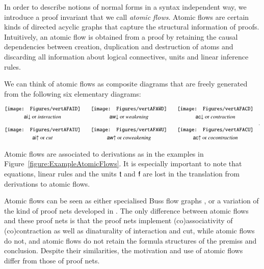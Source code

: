 In order to describe notions of normal forms in a syntax independent way, we introduce a proof invariant that we call \emph{atomic flows}. Atomic flows are certain kinds of directed acyclic graphs that capture the structural information of proofs. Intuitively, an atomic flow is obtained from a proof by retaining the causal dependencies between creation, duplication and destruction of atoms and discarding all information about logical connectives, units and linear inference rules.

We can think of atomic flows as composite diagrams that are freely generated from the following six elementary diagrams:

\[
\begin{array}{@{}c@{}c@{}c@{}}
\vcenter{\hbox{\texttt{[image: Figures/vertAFAID]}}}&
\qquad
\vcenter{\hbox{\texttt{[image: Figures/vertAFAWD]}}}&
\qquad
\vcenter{\hbox{\texttt{[image: Figures/vertAFACD]}}}\\
\noalign{\smallskip}
      \mbox{$\aid$ or \emph{interaction}}&
\qquad\mbox{$\awd$ or \emph{weakening}}&
\qquad\mbox{$\acd$ or \emph{contraction}}\\
\noalign{\bigskip}
\vcenter{\hbox{\texttt{[image: Figures/vertAFAIU]}}}&
\qquad
\vcenter{\hbox{\texttt{[image: Figures/vertAFAWU]}}}&
\qquad
\vcenter{\hbox{\texttt{[image: Figures/vertAFACU]}}}\\
\noalign{\smallskip}
      \mbox{$\aiu$ or \emph{cut}}&
\qquad\mbox{$\awu$ or \emph{coweakening}}&
\qquad\mbox{$\acu$ or \emph{cocontraction}}\\
\end{array}\quad.
\]

Atomic flows are associated to derivations as in the examples in Figure~\vref{figure:ExampleAtomicFlows}. It is especially important to note that equations, linear rules and the units $\mathsf t$ and $\mathsf f$ are lost in the translation from derivations to atomic flows.

Atomic flows can be seen as either specialised Buss flow graphs \cite{Buss:91:The-Unde:uq,Carb:97:Interpol:fk}, or a variation of the kind of proof nets developed in \cite{Stra:05:From-Dee:yb,Stra:09:From-Dee:fr}. The only difference between atomic flows and these proof nets is that the proof nets implement (co)associativity of (co)contraction as well as dinaturality of interaction and cut, while atomic flows do not, and atomic flows do not retain the formula structures of the premiss and conclusion. Despite their similarities, the motivation and use of atomic flows differ from those of proof nets.

